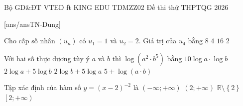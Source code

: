 \def\linkdethi{} %
\anmaQR
\def\toanlop{12}
\def\thoigian{90}
\def\namhoc{2025 - 2026}
\begin{dethi}
	{Bộ GD\&ĐT}
	{VTED ft KING EDU}
	{TDMZZ02}
	{Đề thi thử THPTQG 2026}
\end{dethi}
\caulc
{}[ans/ansTN-Dung]
\begin{ex}%
	Cho cấp số nhân $(u_n)$ có $u_1=1$ và $u_2=2$.
	Giá trị của $u_4$ bằng
	\choice
	{\True $8$}
	{$4$}
	{$16$}
	{$2$}
\end{ex}

\begin{ex}%
	Với hai số thực dương tùy ý $a$ và $b$ thì $\log\left(a^2 \cdot b^5\right)$ bằng
	\choice
	{$10\log a \cdot \log b$}
	{\True $2\log a + 5\log b$}
	{$2\log b + 5\log a$}
	{$5 + \log(a\cdot b)$}
\end{ex}

\begin{ex}%
	Tập xác định của hàm số $y=\left(x-2\right)^{-2}$ là
	\choice
	{$\left(-\infty;+\infty\right)$}
	{$\left(2;+\infty\right)$}
	{\True $\mathbb{R}\setminus\left\{2\right\}$}
	{$\left[2;+\infty\right)$}
\end{ex}

